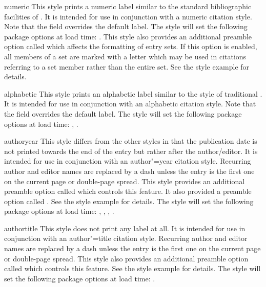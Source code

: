 \documentclass{ltxdockit}[2011/03/25]
\begin{document}
\begin{marglist}

\item[numeric]
This style prints a numeric label similar to the standard bibliographic facilities of \latex. It is intended for use in conjunction with a numeric citation style. Note that the  field overrides the default label. The style will set the following package options at load time: . This style also provides an additional preamble option called  which affects the formatting of entry sets. If this option is enabled, all members of a set are marked with a letter which may be used in citations referring to a set member rather than the entire set. See the style example for details.

\item[alphabetic]
This style prints an alphabetic label similar to the  style of traditional \bibtex. It is intended for use in conjunction with an alphabetic citation style. Note that the  field overrides the default label. The style will set the following package options at load time: , .

\item[authoryear]
This style differs from the other styles in that the publication date is not printed towards the end of the entry but rather after the author\slash editor. It is intended for use in conjunction with an author"=year citation style. Recurring author and editor names are replaced by a dash unless the entry is the first one on the current page or double-page spread. This style provides an additional preamble option called  which controls this feature. It also provided a preamble option called . See the style example for details. The style will set the following package options at load time: , , , .

\item[authortitle]
This style does not print any label at all. It is intended for use in conjunction with an author"=title citation style. Recurring author and editor names are replaced by a dash unless the entry is the first one on the current page or double-page spread. This style also provides an additional preamble option called  which controls this feature. See the style example for details. The style will set the following package options at load time: .


\end{marglist}
\end{document}
